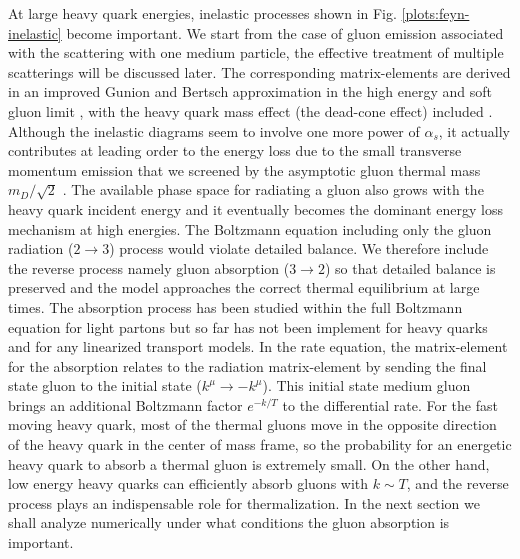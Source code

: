 \documentclass[aps, prc, reprint, amsmath, groupedaddress, nofootinbib]{revtex4-1}
\begin{document}
At large heavy quark energies, inelastic processes shown in Fig. \ref{plots:feyn-inelastic} become important.
We start from the case of gluon emission associated with the scattering with one medium particle, the effective treatment of multiple scatterings will be discussed later.
The corresponding matrix-elements are derived in an improved Gunion and Bertsch approximation in the high energy and soft gluon limit \cite{PhysRevD.25.746,Fochler:2013epa}, with the heavy quark mass effect (the dead-cone effect) included \cite{Uphoff:2014hza}.
Although the inelastic diagrams seem to involve one more power of $\alpha_s$, it actually contributes at leading order to the energy loss due to the small transverse momentum emission that we screened by the asymptotic gluon thermal mass $m_D/\sqrt{2}$ \cite{Ghiglieri:2015ala}.
The available phase space for radiating a gluon also grows with the heavy quark incident energy and it eventually becomes the dominant energy loss mechanism at high energies.
The Boltzmann equation including only the gluon radiation ($2\rightarrow 3$) process would violate detailed balance. We therefore include the reverse process namely gluon absorption ($3\rightarrow 2$) so that detailed balance is preserved and the model approaches the correct thermal equilibrium at large times.
The absorption process has been studied within the full Boltzmann equation \cite{Xu:2004mz} for light partons but so far has not been implement for heavy quarks and for any linearized transport models.
In the rate equation, the matrix-element for the absorption relates to the radiation matrix-element by sending the final state gluon to the initial state ($k^\mu \rightarrow -k^\mu$).
This initial state medium gluon brings an additional Boltzmann factor $e^{-k/T}$ to the differential rate.
For the fast moving heavy quark, most of the thermal gluons move in the opposite direction of the heavy quark in the center of mass frame,
so the probability for an energetic heavy quark to absorb a thermal gluon is extremely small. 
On the other hand, low energy heavy quarks can efficiently absorb gluons with $k \sim T$, and the reverse process plays an indispensable role for thermalization. 
In the next section we shall analyze numerically under what conditions the gluon absorption is important.
\end{document}
